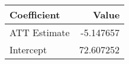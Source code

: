 \begin{tabular}{lr}
\toprule
 Coefficient &     Value \\
\midrule
ATT Estimate & -5.147657 \\
   Intercept & 72.607252 \\
\bottomrule
\end{tabular}
